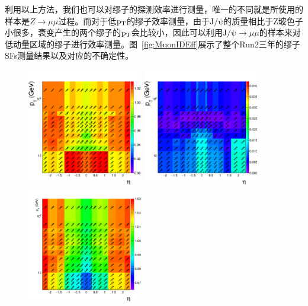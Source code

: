 利用以上方法，我们也可以对缪子的探测效率进行测量，唯一的不同就是所使用的样本是$Z\rightarrow \mu\mu$过程。而对于低$\mathrm{p_{T}}$的缪子效率测量，由于$\mathrm{J/\psi}$的质量相比于Z玻色子小很多，衰变产生的两个缪子的$\mathrm{p_{T}}$会比较小，因此可以利用$\mathrm{J/\psi}\rightarrow\mu\mu$的样本来对低动量区域的缪子进行效率测量。图~\ref{fig:MuonIDEff}展示了整个Run2三年的缪子SFs测量结果以及对应的不确定性。

\begin{figure}[htbp]
  \begin{center}
		\includegraphics[width=0.45\textwidth]{figures/chapter04/2016_SF_legacy_newLoose.png}
    \includegraphics[width=0.45\textwidth]{figures/chapter04/2016_SF_errors_legacy_newLoose.png} \\
		\includegraphics[width=0.45\textwidth]{figures/chapter04/2017_SF_rereco_LooseGT20syst.png}

\end{center}
\end{figure}
